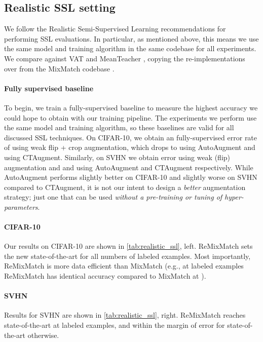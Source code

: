 \documentclass{article} \usepackage{iclr2020_conference,times}
\begin{document}
\subsection{Realistic SSL setting}

We follow the Realistic Semi-Supervised Learning \citep{oliver2018realistic} recommendations for
performing SSL evaluations.
In particular, as mentioned above, this means we use the same model and training
algorithm in the same codebase for all experiments.
We compare against VAT \citep{miyato2018virtual} and MeanTeacher \citep{tarvainen2017weight}, copying the re-implementations
over from the MixMatch codebase \citep{berthelot2019mixmatch}.


\paragraph{Fully supervised baseline}
To begin, we train a fully-supervised baseline to measure the highest
accuracy we could hope to obtain with our training pipeline.
The experiments we perform use the same model
and training algorithm, so these baselines are valid for all discussed SSL techniques.
On CIFAR-10, we obtain an fully-supervised error rate of  using weak flip + crop augmentation, which drops to  using AutoAugment and  using CTAugment.
Similarly, on SVHN we obtain  error using weak (flip) augmentation and  and  using AutoAugment and CTAugment respectively.
While AutoAugment performs slightly better on CIFAR-10 and slightly worse on SVHN compared to CTAugment, it is not our intent to design a \emph{better} augmentation
strategy; just one that can be used \emph{without a pre-training or tuning of hyper-parameters}.


\paragraph{CIFAR-10}
Our results on CIFAR-10 are shown in \cref{tab:realistic_ssl}, left.
ReMixMatch sets the new state-of-the-art for all numbers of
labeled examples.
Most importantly,
ReMixMatch is  more data efficient than MixMatch (e.g., at  labeled
examples ReMixMatch has identical accuracy compared to MixMatch at ).

\paragraph{SVHN} 
Results for SVHN are shown in \cref{tab:realistic_ssl}, right.
ReMixMatch reaches state-of-the-art at  labeled examples,
and within the margin of error for state-of-the-art otherwise.
\end{document}
